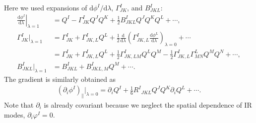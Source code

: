 \documentclass[aps, prd
, preprint
, nofootinbib 
, longbibliography
]{revtex4-1}
\newcommand{\dif}[2]{\frac{\mathrm{d} #1}{\mathrm{d} #2}}
\newcommand{\dd}{\mathrm{d}}
\newcommand{\bae}[1]{\begin{align} #1 \end{align}}
\begin{document}
Here we used expansions of $\dd\phi^I/\dd\lambda$, $\Gamma^I_{JK}$, and $B^I_{JKL}$:
\bae{
    \left.\dif{\phi^I}{\lambda}\right|_{\lambda=1}&=Q^I-\Gamma^I_{JK}Q^JQ^K+\frac{1}{2}B^I_{JKL}Q^JQ^KQ^L+\cdots, \nonumber \\
    \Gamma^I_{JK}|_{\lambda=1}&=\Gamma^I_{JK}+\Gamma^I_{JK,L}Q^L+\frac{1}{2}\dif{}{\lambda}\left(\Gamma^I_{JK,L}\dif{\phi^L}{\lambda}\right)_{\lambda=0}+\cdots \nonumber \\
    &=\Gamma^I_{JK}+\Gamma^I_{JK,L}Q^L+\frac{1}{2}\Gamma^I_{JK,LM}Q^LQ^M-\frac{1}{2}\Gamma^I_{JK,L}\Gamma^L_{MN}Q^MQ^N+\cdots, \nonumber \\
    B^I_{JKL}|_{\lambda=1}&=B^I_{JKL}+B^I_{JKL,M}Q^M+\cdots.
    \label{eq: expansion at lambda 1}
}
The gradient is similarly obtained as
\bae{
    (\partial_i\phi^I)_\parallel|_{\lambda=0}=\partial_iQ^I+\frac{1}{6}R^I{}_{JKL}Q^JQ^K\partial_iQ^L+\cdots.
}
Note that $\partial_i$ is already covariant because we neglect the spatial dependence of IR modes, $\partial_i\varphi^I=0$.
\end{document}
